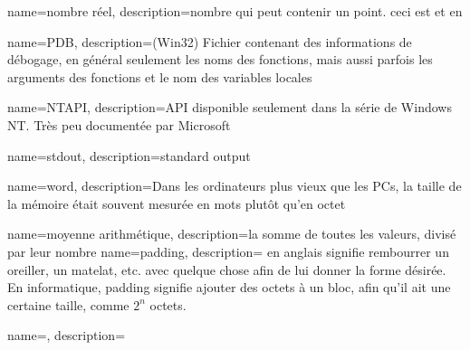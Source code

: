 {
  name={nombre réel},
  description={nombre qui peut contenir un point. ceci est \Tfloat et \Tdouble en \CCpp}
}

{
  name=PDB,
  description={(Win32) Fichier contenant des informations de débogage, en général seulement les noms des fonctions,
  mais aussi parfois les arguments des fonctions et le nom des variables locales}
}

{
  name=NTAPI,
  description={\ac{API} disponible seulement dans la série de Windows NT. Très peu documentée par Microsoft}
}

{
  name=stdout,
  description={standard output}
}

{
  name=word,
  description={Dans les ordinateurs plus vieux que les PCs, la taille de la mémoire était
  souvent mesurée en mots plutôt qu'en octet}
}

{
  name={moyenne arithmétique},
  description={la somme de toutes les valeurs, divisé par leur nombre}
}
{
  name=padding,
  description={ en anglais signifie rembourrer un oreiller, un matelat, etc. avec quelque chose afin de lui donner la forme désirée.
  En informatique, padding signifie ajouter des octets à un bloc, afin qu'il ait une certaine taille, comme $2^n$ octets.}
}

{
  name=\FRph{},
  description=\FRph{}
}

